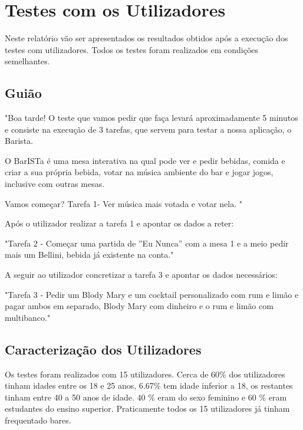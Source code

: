 \documentclass{article}
\begin{document}
\section*{Testes com os Utilizadores}
Neste relatório vão ser apresentados os resultados obtidos após a execução dos testes com utilizadores. Todos os testes foram realizados em condições semelhantes.

\subsection*{Guião}
"Boa tarde!
O teste que vamos pedir que faça levará aproximadamente 5 minutos e consiste na execução de 3 tarefas, que servem para testar a nossa aplicação, o Barista.

O BarISTa é uma mesa interativa na qual pode ver e pedir bebidas, comida e criar a sua própria bebida, votar na música ambiente do bar e jogar jogos, inclusive com outras mesas.

Vamos começar? Tarefa 1- Ver música mais votada e votar nela. "

Após o utilizador realizar a tarefa 1 e apontar os dados a reter:

"Tarefa 2 - Começar uma partida de ”Eu Nunca” com a mesa 1 e a meio pedir mais um Bellini, bebida já existente na conta."
 
A seguir ao utilizador concretizar a tarefa 3 e apontar os dados necessários: 

"Tarefa 3 - Pedir um Blody Mary e um cocktail personalizado com rum e limão e pagar ambos em separado, Blody Mary com dinheiro e o rum e limão com multibanco." 


\subsection*{Caracterização dos Utilizadores}
Os testes foram realizados com 15 utilizadores.
Cerca de 60\% dos utilizadores tinham idades entre os 18 e 25 anos, 6.67\% tem idade inferior a 18, os restantes tinham entre 40 a 50 anos de idade. 40 \% eram do sexo feminino e 60 \% eram estudantes do ensino superior.
Praticamente todos os 15 utilizadores já tinham frequentado bares.
\end{document}
